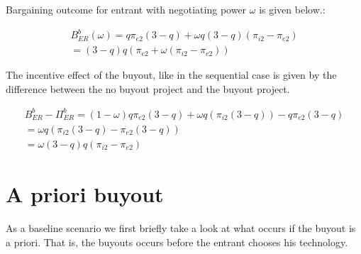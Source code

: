 \documentclass[11pt]{article}
\begin{document}
Bargaining outcome for entrant with negotiating power $\omega$ is given below.:

\begin{align*}
B_{ER}^{b}(\omega) = 
q\pi_{e2}(3-q)+\omega q (3-q)(\pi_{i2} - \pi_{e2}) \\
= (3-q)q(\pi_{e2}+\omega  (\pi_{i2} - \pi_{e2}))
\end{align*}

The incentive effect of the buyout, like in the sequential case is given by the difference between the no buyout project and the buyout project. 

\begin{align*}
B_{ER}^{b}-\Pi_{ER}^{b} = 
(1-\omega) q\pi_{e2}(3-q)
+ \omega q 
\left(
\pi_{i2} (3-q)
\right)
-
q\pi_{e2}(3-q) \\
=\omega q 
\left(
\pi_{i2} (3-q)
-\pi_{e2}(3-q)
\right) \\
=\omega (3-q)q 
\left(
\pi_{i2} 
-\pi_{e2}
\right) 
\end{align*}

\section*{A priori buyout}

As a baseline scenario we first briefly take a look at what occurs if the buyout is a priori. That is, the buyouts occurs before the entrant chooses his technology. 
\end{document}
